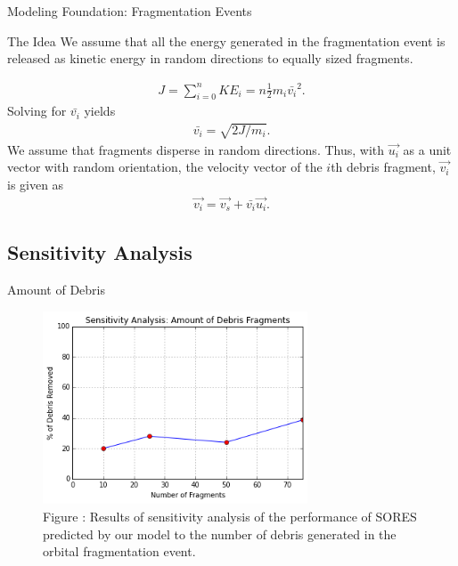 \documentclass{beamer}
\begin{document}

\begin{frame}{Modeling Foundation: Fragmentation Events}
\begin{block}{The Idea}
We assume that all the energy generated in the fragmentation event is released as kinetic energy in random directions to equally sized fragments.
\end{block}

\begin{align}
J = \sum_{i = 0}^{n} \mathit{\mathit{KE}}_{i} = n \frac{1}{2} m_{i}\bar{v_{i}}^2.
\end{align}
Solving for $\bar{v_{i}}$ yields
\begin{align}
\bar{v_{i}} = \sqrt{2 J / m_{i}}.
\end{align}
We assume that fragments disperse in random directions. Thus, with $\vec{u_{i}}$ as a unit vector with random orientation, the velocity vector of the $i$th debris fragment, $\vec{v_i}$ is given as
\begin{align}
\vec{v_{i}} = \vec{v_{s}} + \bar{v_{i}} \vec{u_i}.
\end{align}

\end{frame}


\subsection{Sensitivity Analysis}

\begin{frame}{Amount of Debris}
\begin{figure}
\begin{center}
\label{fig:debrisfragmentssensitivity}
\includegraphics[width=0.7\textwidth]{fragments.png}\\
Figure : Results of sensitivity analysis of the performance of SORES predicted by our model to the number of debris generated in the orbital fragmentation event.
\end{center}
\end{figure}
\end{frame}
\end{document}

